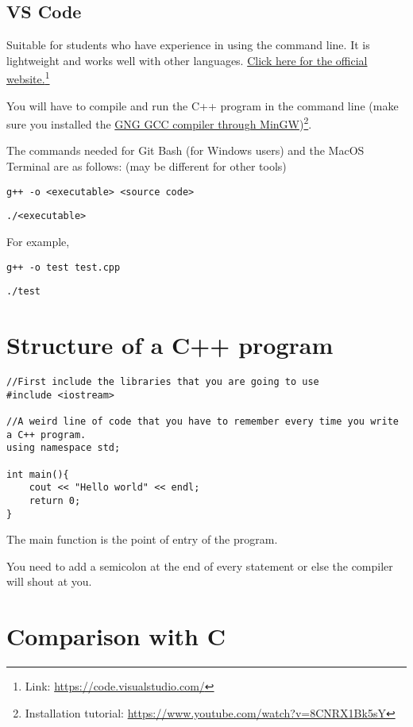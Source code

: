 \subsection*{VS Code}

Suitable for students who have experience in using the command line. It is lightweight and works well with other languages. \href{https://code.visualstudio.com/}{Click here for the official website.}\footnote{Link: \href{https://code.visualstudio.com/}{https://code.visualstudio.com/}}

You will have to compile and run the C++ program in the command line (make sure you installed the \href{https://www.youtube.com/watch?v=8CNRX1Bk5sY}{GNG GCC compiler through MinGW})\footnote{Installation tutorial: \href{https://www.youtube.com/watch?v=8CNRX1Bk5sY}{https://www.youtube.com/watch?v=8CNRX1Bk5sY}}.

The commands needed for Git Bash (for Windows users) and the MacOS Terminal are as follows: (may be different for other tools)
\vspace{6mm}

\texttt{g++ -o <executable> <source code>}

\texttt{./<executable>}
\vspace{6mm}

For example,

\texttt{g++ -o test test.cpp}

\texttt{./test}


\section{Structure of a C++ program}
\begin{lstlisting}
//First include the libraries that you are going to use
#include <iostream> 

//A weird line of code that you have to remember every time you write a C++ program.
using namespace std;

int main(){
    cout << "Hello world" << endl;
    return 0;
}
\end{lstlisting}

The main function is the point of entry of the program.

You need to add a semicolon at the end of every statement or else the compiler will shout at you. 

\section{Comparison with C}

